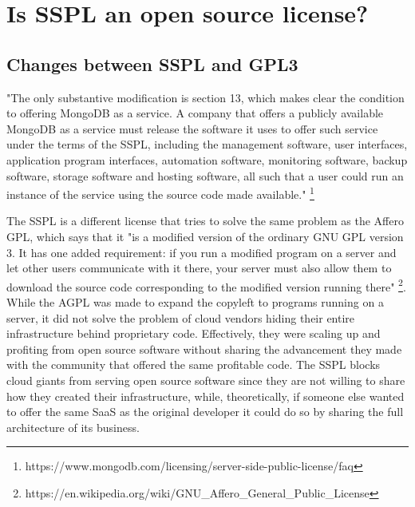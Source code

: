 \documentclass[12pt, a4paper]{article}
\begin{document}
  \pagebreak
  \section{Is SSPL an open source license?}
  \subsection{Changes between SSPL and GPL3}
  "The only substantive modification is section 13, which makes clear the condition to offering MongoDB as a service. A company that offers a publicly available MongoDB as a service must release the software it uses to offer such service under the terms of the SSPL, including the management software, user interfaces, application program interfaces, automation software, monitoring software, backup software, storage software and hosting software, all such that a user could run an instance of the service using the source code made available." \footnote{https://www.mongodb.com/licensing/server-side-public-license/faq}

  The SSPL is a different license that tries to solve the same problem as the Affero GPL, which says that it "is a modified version of the ordinary GNU GPL version 3. It has one added requirement: if you run a modified program on a server and let other users communicate with it there, your server must also allow them to download the source code corresponding to the modified version running there" \footnote{https://en.wikipedia.org/wiki/GNU\_Affero\_General\_Public\_License}. While the AGPL was made to expand the copyleft to programs running on a server, it did not solve the problem of cloud vendors hiding their entire infrastructure behind proprietary code. Effectively, they were scaling up and profiting from open source software without sharing the advancement they made with the community that offered the same profitable code. The SSPL blocks cloud giants from serving open source software since they are not willing to share how they created their infrastructure, while, theoretically, if someone else wanted to offer the same SaaS as the original developer it could do so by sharing the full architecture of its business.

\end{document}
